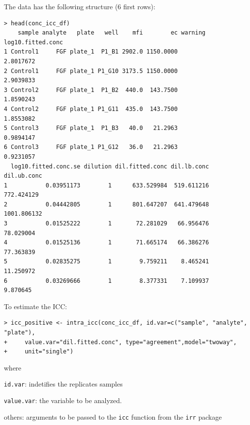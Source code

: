 \documentclass[11pt]{article}\usepackage[]{graphicx}\usepackage[]{color}
\makeatletter
\newenvironment{kframe}{%
 \def\at@end@of@kframe{}%
 \ifinner\ifhmode%
  \def\at@end@of@kframe{\end{minipage}}%
  \begin{minipage}{\columnwidth}%
 \fi\fi%
 \def\FrameCommand##1{\hskip\@totalleftmargin \hskip-\fboxsep
 \colorbox{shadecolor}{##1}\hskip-\fboxsep
     \hskip-\linewidth \hskip-\@totalleftmargin \hskip\columnwidth}%
 \MakeFramed {\advance\hsize-\width
   \@totalleftmargin\z@ \linewidth\hsize
   \@setminipage}}%
 {\par\unskip\endMakeFramed%
 \at@end@of@kframe}
\newenvironment{knitrout}{}{} %
\newenvironment{itemize*}%
    {\begin{itemize}%
        \setlength{\itemsep}{-0.35cm}%
        \setlength{\parskip}{10pt}}%
{\end{itemize}}
\makeatother
\begin{document}
\noindent The data has the following structure (6 first rows):
\begin{knitrout}
\color{fgcolor}\begin{kframe}
\begin{verbatim}
> head(conc_icc_df)
    sample analyte   plate   well    mfi        ec warning log10.fitted.conc
1 Control1     FGF plate_1  P1_B1 2902.0 1150.0000                 2.8017672
2 Control1     FGF plate_1 P1_G10 3173.5 1150.0000                 2.9039833
3 Control2     FGF plate_1  P1_B2  440.0  143.7500                 1.8590243
4 Control2     FGF plate_1 P1_G11  435.0  143.7500                 1.8553082
5 Control3     FGF plate_1  P1_B3   40.0   21.2963                 0.9894147
6 Control3     FGF plate_1 P1_G12   36.0   21.2963                 0.9231057
  log10.fitted.conc.se dilution dil.fitted.conc dil.lb.conc dil.ub.conc
1           0.03951173        1      633.529984  519.611216  772.424129
2           0.04442805        1      801.647207  641.479648 1001.806132
3           0.01525222        1       72.281029   66.956476   78.029004
4           0.01525136        1       71.665174   66.386276   77.363839
5           0.02835275        1        9.759211    8.465241   11.250972
6           0.03269666        1        8.377331    7.109937    9.870645
\end{verbatim}
\end{kframe}
\end{knitrout}

\noindent To estimate the ICC:

\begin{knitrout}
\color{fgcolor}\begin{kframe}
\begin{verbatim}
> icc_positive <- intra_icc(conc_icc_df, id.var=c("sample", "analyte", "plate"), 
+     value.var="dil.fitted.conc", type="agreement",model="twoway", 
+     unit="single")
\end{verbatim}
\end{kframe}
\end{knitrout}

\noindent where

\begin{itemize*}
    \item {\tt id.var}: indetifies the replicates samples
    \item {\tt value.var}: the variable to be analyzed.
    \item others: arguments to be passed to the {\tt icc} function from the
{\tt irr} package
\end{itemize*}
\end{document}
